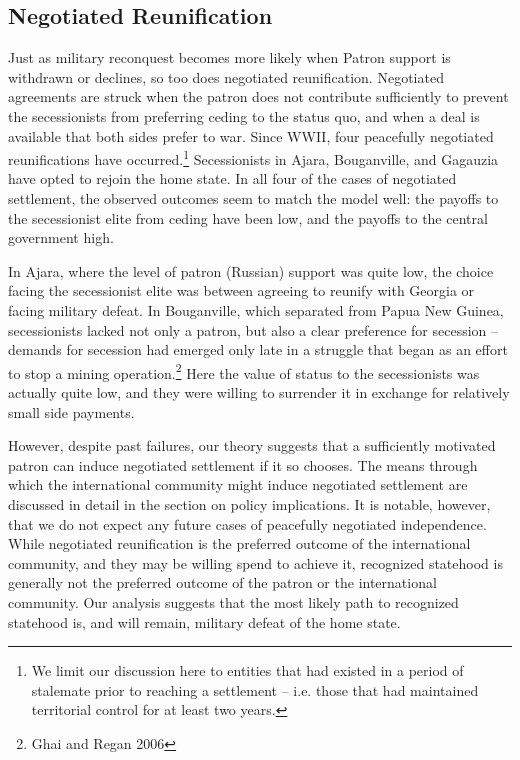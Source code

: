 \documentclass[12pt,letterpaper, notitlepage]{article}
\begin{document}
\subsection*{Negotiated Reunification}

Just as military reconquest becomes more likely when Patron support is withdrawn or declines, so too does negotiated reunification. Negotiated agreements are struck when the patron does not contribute sufficiently to prevent the secessionists from preferring ceding to the status quo, and when a deal is available that both sides prefer to war. Since WWII, four peacefully negotiated reunifications have occurred.\footnote{We limit our discussion here to entities that had existed in a period of stalemate prior to reaching a settlement -- i.e. those that had maintained territorial control for at least two years.} Secessionists in Ajara, Bouganville, and Gagauzia have opted to rejoin the home state.  In all four of the cases of negotiated settlement, the observed outcomes seem to match the model well: the payoffs to the secessionist elite from ceding have been low, and the payoffs to the central government high.

In Ajara, where the level of patron (Russian) support was quite low, the choice facing the secessionist elite was between agreeing to reunify with Georgia or facing military defeat. In Bouganville, which separated from Papua New Guinea, secessionists lacked not only a patron, but also a clear preference for secession -- demands for secession had emerged only late in a struggle that began as an effort to stop a mining operation.\footnote{Ghai and Regan 2006}  Here the value of status to the secessionists was actually quite low, and they were willing to surrender it in exchange for relatively small side payments.

However, despite past failures, our theory suggests that a sufficiently motivated patron can induce negotiated settlement if it so chooses. The means through which the international community might induce negotiated settlement are discussed in detail in the section on policy implications. It is notable, however, that we do not expect any future cases of peacefully negotiated independence.  While negotiated reunification is the preferred outcome of the international community, and they may be willing spend to achieve it, recognized statehood is generally not the preferred outcome of the patron or the international community. Our analysis suggests that the most likely path to recognized statehood is, and will remain, military defeat of the home state.
\end{document}
